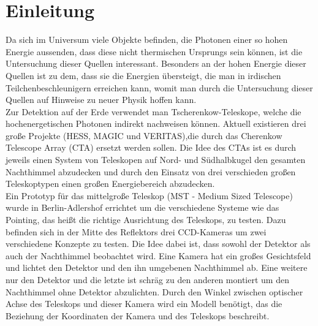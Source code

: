\chapter{Einleitung}
Da sich im Universum viele Objekte befinden, die Photonen einer so hohen Energie aussenden, dass diese nicht thermischen Ursprungs sein können, ist die Untersuchung dieser Quellen interessant. Besonders an der hohen Energie dieser Quellen ist zu dem, dass sie die Energien übersteigt, die man in irdischen Teilchenbeschleunigern erreichen kann, womit man durch die Untersuchung dieser Quellen auf Hinweise zu neuer Physik hoffen kann.\\
Zur Detektion auf der Erde verwendet man Tscherenkow-Teleskope, welche die hochenergetischen Photonen indirekt nachweisen können. Aktuell existieren drei große Projekte (HESS, MAGIC und VERITAS),die durch das Cherenkow Telescope Array (CTA) ersetzt werden sollen. Die Idee des CTAs ist es durch jeweils einen System von Teleskopen auf Nord- und Südhalbkugel den gesamten Nachthimmel abzudecken und durch den Einsatz von drei verschieden großen Teleskoptypen einen großen Energiebereich abzudecken.\\
Ein Prototyp für das mittelgroße Teleskop (MST - Medium Sized Telescope) wurde in Berlin-Adlershof errichtet um die verschiedene Systeme wie das Pointing, das heißt die richtige Ausrichtung des Teleskops, zu testen. Dazu befinden sich in der Mitte des Reflektors drei CCD-Kameras um zwei verschiedene Konzepte zu testen. Die Idee dabei ist, dass sowohl der Detektor als auch der Nachthimmel beobachtet wird. Eine Kamera hat ein großes Gesichtsfeld und lichtet den Detektor und den ihn umgebenen Nachthimmel ab. Eine weitere nur den Detektor und die letzte ist schräg zu den anderen montiert um den Nachthimmel ohne Detektor abzulichten. Durch den Winkel zwischen optischer Achse des Teleskops und dieser Kamera wird ein Modell benötigt, das die Beziehung der Koordinaten der Kamera und des Teleskops beschreibt.